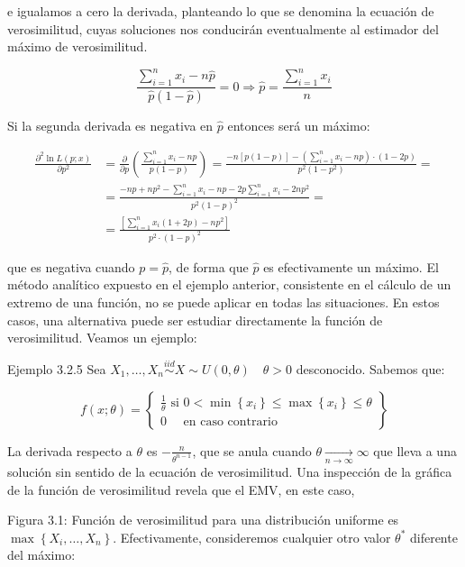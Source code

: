 \documentclass[
]{article}
\begin{document}
e igualamos a cero la derivada, planteando lo que se denomina la ecuación de verosimilitud, cuyas soluciones nos conducirán eventualmente al estimador del máximo de verosimilitud.

\[
\frac{\sum_{i=1}^{n} x_{i}-n \hat{p}}{\hat{p}(1-\hat{p})}=0 \Rightarrow \hat{p}=\frac{\sum_{i=1}^{n} x_{i}}{n}
\]

Si la segunda derivada es negativa en \(\widehat{p}\) entonces será un máximo:

\[
\begin{aligned}
\frac{\partial^{2} \ln L(p ; x)}{\partial p^{2}} & =\frac{\partial}{\partial p}\left(\frac{\sum_{i=1}^{n} x_{i}-n p}{p(1-p)}\right)=\frac{-n[p(1-p)]-\left(\sum_{i=1}^{n} x_{i}-n p\right) \cdot(1-2 p)}{p^{2}\left(1-p^{2}\right)}= \\
& =\frac{-n p+n p^{2}-\sum_{i=1}^{n} x_{i}-n p-2 p \sum_{i=1}^{n} x_{i}-2 n p^{2}}{p^{2}(1-p)^{2}}= \\
& =\frac{\left[\sum_{i=1}^{n} x_{i}(1+2 p)-n p^{2}\right]}{p^{2} \cdot(1-p)^{2}}
\end{aligned}
\]

que es negativa cuando \(p=\hat{p}\), de forma que \(\hat{p}\) es efectivamente un máximo.
El método analítico expuesto en el ejemplo anterior, consistente en el cálculo de un extremo de una función, no se puede aplicar en todas las situaciones. En estos casos, una alternativa puede ser estudiar directamente la función de verosimilitud. Veamos un ejemplo:

Ejemplo 3.2.5 Sea \(X_{1}, \ldots, X_{n} \stackrel{i i d}{\sim} X \sim U(0, \theta) \quad \theta>0\) desconocido. Sabemos que:

\[
f(x ; \theta)=\left\{\begin{array}{c}
\frac{1}{\theta} \text { si } 0<\min \left\{x_{i}\right\} \leq \max \left\{x_{i}\right\} \leq \theta \\
0 \quad \text { en caso contrario }
\end{array}\right\}
\]

La derivada respecto a \(\theta\) es \(-\frac{n}{\theta^{n-1}}\), que se anula cuando \(\theta \underset{n \rightarrow \infty}{\longrightarrow} \infty\) que lleva a una solución sin sentido de la ecuación de verosimilitud. Una inspección de la gráfica de la función de verosimilitud revela que el EMV, en este caso,

Figura 3.1: Función de verosimilitud para una distribución uniforme
es \(\max \left\{X_{i}, \ldots, X_{n}\right\}\). Efectivamente, consideremos cualquier otro valor \(\theta^{*}\) diferente del máximo:
\end{document}

